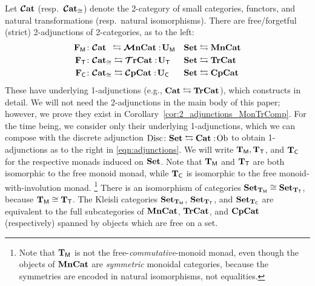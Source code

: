 \documentclass[11pt,oneside,article]{memoir}
\begin{document}
Let $\bm{\mathcal{C}}\mathbf{at}$ (resp.\ $\bm{\mathcal{C}}\mathbf{at}_{\cong}$) denote the 2-category of small categories, functors, and natural
transformations (resp.\ natural isomorphisms). There are free/forgetful (strict) 2-adjunctions of
2-categories, as to the left:
\begin{align}
   \nonumber
   \mathbf{F}_{\mathsf{M}}&\colon\bm{\mathcal{C}}\mathbf{at}_{\;\;} \leftrightarrows\bm{\mathcal{M}}\mathbf{nCat}:\!\mathbf{U}_{\mathsf{M}}
      & \mathbf{Set} &\leftrightarrows\mathbf{MnCat} \\
   \label{eqn:adjunctions}
   \mathbf{F}_{\mathsf{T}}&\colon\bm{\mathcal{C}}\mathbf{at}_{\cong}\leftrightarrows\bm{\mathcal{T}}\mathbf{rCat}:\!\mathbf{U}_{\mathsf{T}}
      & \mathbf{Set} &\leftrightarrows\mathbf{TrCat} \\
   \nonumber
   \mathbf{F}_{\mathsf{C}}&\colon\bm{\mathcal{C}}\mathbf{at}_{\cong}\leftrightarrows\bm{\mathcal{C}}\mathbf{pCat}:\!\mathbf{U}_{\mathsf{C}}
      & \mathbf{Set}&\leftrightarrows\mathbf{CpCat}
\end{align}
These have underlying 1-adjunctions (e.g., $\mathbf{Cat}\leftrightarrows\mathbf{TrCat}$), which \cite{Abramsky2}
constructs in detail. We will not need the 2-adjunctions in the main body of this paper; however,
we prove they exist in Corollary~\ref{cor:2_adjunctions_MonTrComp}. For the time being, we
consider only their underlying 1-adjunctions, which we can compose with the discrete adjunction
$\mathrm{Disc}\colon\mathbf{Set}\leftrightarrows\mathbf{Cat}:\!\mathrm{Ob}$ to obtain 1-adjunctions as to the right in
\eqref{eqn:adjunctions}. We will write $\mathbf{T}_{\mathsf{M}}, \mathbf{T}_{\mathsf{T}}$, and $\mathbf{T}_{\mathsf{C}}$ for the respective monads induced
on $\mathbf{Set}$. Note that $\mathbf{T}_{\mathsf{M}}$ and $\mathbf{T}_{\mathsf{T}}$ are both isomorphic to the free monoid monad, while $\mathbf{T}_{\mathsf{C}}$ is
isomorphic to the free monoid-with-involution monad.%
\footnote{
   Note that $\mathbf{T}_{\mathsf{M}}$ is not the free-\emph{commutative}-monoid monad, even though the objects of
   $\mathbf{MnCat}$ are \emph{symmetric} monoidal categories, because the symmetries are encoded in natural
   isomorphisms, not equalities.
}
There is an isomorphism of categories $\mathbf{Set}_{\mathbf{T}_{\mathsf{M}}}\cong\mathbf{Set}_{\mathbf{T}_{\mathsf{T}}}$, because $\mathbf{T}_{\mathsf{M}}\cong\mathbf{T}_{\mathsf{T}}$. The Kleisli
categories $\mathbf{Set}_{\mathbf{T}_{\mathsf{M}}}$, $\mathbf{Set}_{\mathbf{T}_{\mathsf{T}}}$, and $\mathbf{Set}_{\mathbf{T}_{\mathsf{C}}}$ are equivalent to the full subcategories of
$\mathbf{MnCat}$, $\mathbf{TrCat}$, and $\mathbf{CpCat}$ (respectively) spanned by objects which are free on a set.
\end{document}
